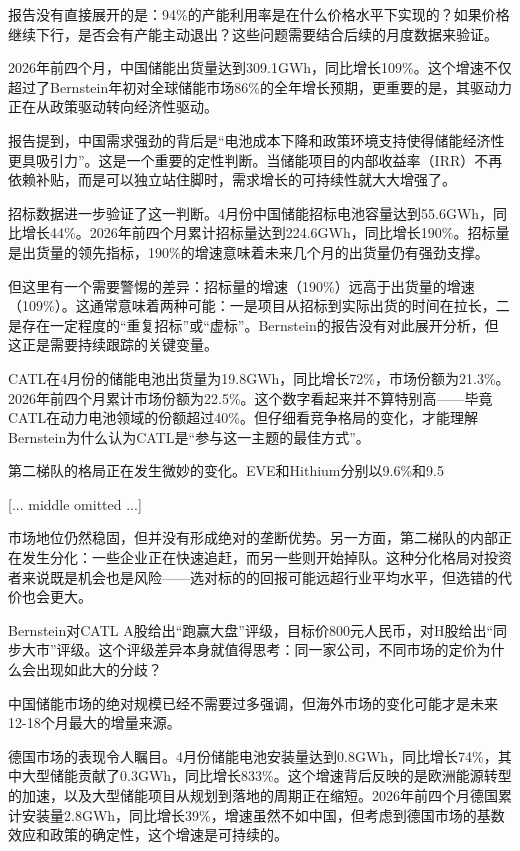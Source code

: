 \documentclass[11pt]{ctexart}
\begin{document}
报告没有直接展开的是：94\%的产能利用率是在什么价格水平下实现的？如果价格继续下行，是否会有产能主动退出？这些问题需要结合后续的月度数据来验证。

2026年前四个月，中国储能出货量达到309.1GWh，同比增长109\%。这个增速不仅超过了Bernstein年初对全球储能市场86\%的全年增长预期，更重要的是，其驱动力正在从政策驱动转向经济性驱动。

报告提到，中国需求强劲的背后是“电池成本下降和政策环境支持使得储能经济性更具吸引力”。这是一个重要的定性判断。当储能项目的内部收益率（IRR）不再依赖补贴，而是可以独立站住脚时，需求增长的可持续性就大大增强了。

招标数据进一步验证了这一判断。4月份中国储能招标电池容量达到55.6GWh，同比增长44\%。2026年前四个月累计招标量达到224.6GWh，同比增长190\%。招标量是出货量的领先指标，190\%的增速意味着未来几个月的出货量仍有强劲支撑。

但这里有一个需要警惕的差异：招标量的增速（190\%）远高于出货量的增速（109\%）。这通常意味着两种可能：一是项目从招标到实际出货的时间在拉长，二是存在一定程度的“重复招标”或“虚标”。Bernstein的报告没有对此展开分析，但这正是需要持续跟踪的关键变量。

CATL在4月份的储能电池出货量为19.8GWh，同比增长72\%，市场份额为21.3\%。2026年前四个月累计市场份额为22.5\%。这个数字看起来并不算特别高——毕竟CATL在动力电池领域的份额超过40\%。但仔细看竞争格局的变化，才能理解Bernstein为什么认为CATL是“参与这一主题的最佳方式”。

第二梯队的格局正在发生微妙的变化。EVE和Hithium分别以9.6\%和9.5

[... middle omitted ...]

市场地位仍然稳固，但并没有形成绝对的垄断优势。另一方面，第二梯队的内部正在发生分化：一些企业正在快速追赶，而另一些则开始掉队。这种分化格局对投资者来说既是机会也是风险——选对标的的回报可能远超行业平均水平，但选错的代价也会更大。

Bernstein对CATL A股给出“跑赢大盘”评级，目标价800元人民币，对H股给出“同步大市”评级。这个评级差异本身就值得思考：同一家公司，不同市场的定价为什么会出现如此大的分歧？

中国储能市场的绝对规模已经不需要过多强调，但海外市场的变化可能才是未来12-18个月最大的增量来源。

德国市场的表现令人瞩目。4月份储能电池安装量达到0.8GWh，同比增长74\%，其中大型储能贡献了0.3GWh，同比增长833\%。这个增速背后反映的是欧洲能源转型的加速，以及大型储能项目从规划到落地的周期正在缩短。2026年前四个月德国累计安装量2.8GWh，同比增长39\%，增速虽然不如中国，但考虑到德国市场的基数效应和政策的确定性，这个增速是可持续的。
\end{document}
